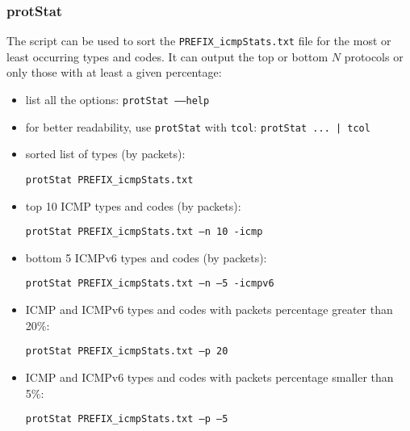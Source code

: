 \documentclass[documentation]{subfiles}
\begin{document}
\subsubsection{protStat}
The {\tt{}} script can be used to sort the {\tt PREFIX\_icmpStats.txt} file for the most or least occurring types and codes.
It can output the top or bottom $N$ protocols or only those with at least a given percentage:
\begin{itemize}
    \item list all the options: {\tt protStat --{}--help}
    \item for better readability, use {\tt protStat} with {\tt tcol}: {\tt protStat ... | tcol}
    \item sorted list of types (by packets):
          \begin{center}
              {\tt protStat PREFIX\_icmpStats.txt}
          \end{center}
    \item top 10 ICMP types and codes (by packets):
          \begin{center}
              {\tt protStat PREFIX\_icmpStats.txt --n 10 -icmp}
          \end{center}
    \item bottom 5 ICMPv6 types and codes (by packets):
          \begin{center}
            {\tt protStat PREFIX\_icmpStats.txt --n --5 -icmpv6}
          \end{center}
    \item ICMP and ICMPv6 types and codes with packets percentage greater than 20\%:
          \begin{center}
            {\tt protStat PREFIX\_icmpStats.txt --p 20}
          \end{center}
    \item ICMP and ICMPv6 types and codes with packets percentage smaller than 5\%:
          \begin{center}
            {\tt protStat PREFIX\_icmpStats.txt --p --5}
          \end{center}
\end{itemize}



\end{document}
